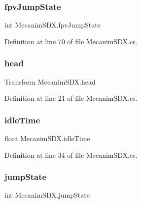 \subsubsection{\texorpdfstring{fpvJumpState}{fpvJumpState}}
{\footnotesize\ttfamily int Mecanim\+S\+D\+X.\+fpv\+Jump\+State\hspace{0.3cm}{\ttfamily [protected]}}



Definition at line 70 of file Mecanim\+S\+D\+X.\+cs.

\mbox{\label{class_mecanim_s_d_x_a7004be4cf215d662e125528e535c3ccb}} 
\subsubsection{\texorpdfstring{head}{head}}
{\footnotesize\ttfamily Transform Mecanim\+S\+D\+X.\+head\hspace{0.3cm}{\ttfamily [protected]}}



Definition at line 21 of file Mecanim\+S\+D\+X.\+cs.

\mbox{\label{class_mecanim_s_d_x_af2461d472095e7bb97f519f46b5ab445}} 
\subsubsection{\texorpdfstring{idleTime}{idleTime}}
{\footnotesize\ttfamily float Mecanim\+S\+D\+X.\+idle\+Time\hspace{0.3cm}{\ttfamily [protected]}}



Definition at line 34 of file Mecanim\+S\+D\+X.\+cs.

\mbox{\label{class_mecanim_s_d_x_a02712a384033b6afd8a456ac010abf52}} 
\subsubsection{\texorpdfstring{jumpState}{jumpState}}
{\footnotesize\ttfamily int Mecanim\+S\+D\+X.\+jump\+State\hspace{0.3cm}{\ttfamily [protected]}}



